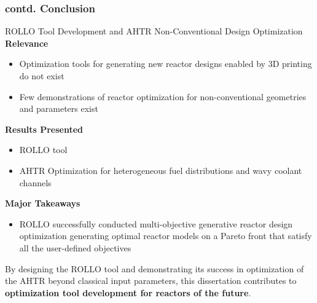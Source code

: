 \begin{frame}
    \frametitle{contd. Conclusion}
    \begin{block}{ROLLO Tool Development and AHTR Non-Conventional Design Optimization}
        \small
        \textbf{Relevance}
        \begin{itemize}
            \item Optimization tools for generating new reactor designs enabled by
            3D printing do not exist
            \item Few demonstrations of reactor optimization for non-conventional 
            geometries and parameters exist
        \end{itemize}
        \textbf{Results Presented}
        \begin{itemize}
            \item \acrfull{ROLLO} tool 
            \item AHTR Optimization for heterogeneous fuel distributions and wavy 
            coolant channels 
        \end{itemize}
        \textbf{Major Takeaways} 
        \begin{itemize}
            \item ROLLO successfully conducted multi-objective generative reactor 
            design optimization generating optimal reactor models on a Pareto front 
            that satisfy all the user-defined objectives
        \end{itemize}
    \end{block}
    \vspace{-0.1cm}
    By designing the ROLLO tool and demonstrating its success in 
    optimization of the \gls{AHTR} beyond classical input parameters, this dissertation 
    contributes to \textbf{optimization tool development for reactors of the future}. 
\end{frame}


